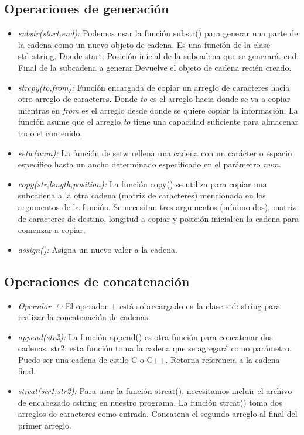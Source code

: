\subsection{Operaciones de generación}
\begin{itemize}
	\item \emph{substr(start,end):} Podemos usar la función substr() para generar una parte de la cadena como un nuevo objeto de cadena. Es una función de la clase std::string. Donde start: Posición inicial de la subcadena que se generará.
	end: Final de la subcadena a generar.Devuelve el objeto de cadena recién creado.
	\item \emph{strcpy(to,from):} Función encargada de copiar un arreglo de caracteres hacia otro arreglo de caracteres. Donde \emph{to} es el arreglo hacia donde se va a copiar mientras en \emph{from} es el arreglo desde donde se quiere copiar la información. La función asume que el arreglo \emph{to} tiene una capacidad suficiente para almacenar todo el contenido. 
	\item \emph{setw(num):} La función de setw rellena una cadena con un carácter o espacio específico hasta un ancho determinado especificado en el parámetro \emph{num}.
	\item \emph{copy(str,length,position):} La función copy() se utiliza para copiar una subcadena a la otra cadena (matriz de caracteres) mencionada en los argumentos de la función. Se necesitan tres argumentos (mínimo dos), matriz de caracteres de destino, longitud a copiar y posición inicial en la cadena para comenzar a copiar.
	\item \emph{assign():} Asigna un nuevo valor a la cadena.
\end{itemize}
\subsection{Operaciones de concatenación}
\begin{itemize}
	\item \emph{Operador +:} El operador + está sobrecargado en la clase std::string para realizar la concatenación de cadenas.
	\item \emph{append(str2):} La función append() es otra función para concatenar dos cadenas. str2: esta función toma la cadena que se agregará como parámetro. Puede ser una cadena de estilo C o C++. Retorna referencia a la cadena final.
	\item \emph{strcat(str1,str2):} Para usar la función strcat(), necesitamos incluir el archivo de encabezado cstring en nuestro programa. La función strcat() toma dos arreglos de caracteres como entrada. Concatena el segundo arreglo al final del  primer arreglo.
\end{itemize}
